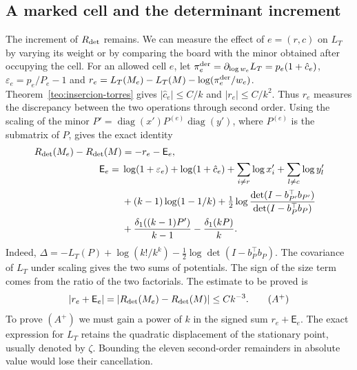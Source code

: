 \subsection{A marked cell and the determinant increment \texorpdfstring{}{[D]}}
The increment of $R_{\rm det}$ remains. We can measure the effect of $e=(r,c)$ on $L_T$ by varying
its weight or by comparing the board with the minor obtained after occupying the cell. For an
allowed cell $e$, let $\pi^{\rm der}_e=\partial_{\log w_e}L_T=p_e(1+\hat c_e)$,
$\varepsilon_e=p_e/P_e-1$ and $r_e=L_T(M_e)-L_T(M)-\log(\pi^{\rm der}_e/w_e)$.
Theorem~\ref{teo:insercion-torres}
gives $|\hat c_e|\le C/k$ and $|r_e|\le C/k^2$. Thus $r_e$ measures the discrepancy between the
two operations through second order. Using the scaling of the minor
$P'=\operatorname{diag}(x')P^{(e)}\operatorname{diag}(y')$, where $P^{(e)}$ is the submatrix of
$P$, gives the exact identity
\begin{align*}
 R_{\rm det}(M_e)-R_{\rm det}(M)&=-r_e-\mathsf E_e,\\
 \mathsf E_e={}&\log(1+\varepsilon_e)+\log(1+\hat c_e)
          +\sum_{i\ne r}\log x'_i+\sum_{l\ne c}\log y'_l\\
 &+(k-1)\log(1-1/k)
  +\tfrac12\log\frac{\det(I-b_{P'}^\top b_{P'})}{\det(I-b_P^\top b_P)}\\
 &+\frac{\delta_1((k-1)P')}{k-1}-\frac{\delta_1(kP)}k .
\end{align*}
Indeed, $\Delta=-L_T(P)+\log(k!/k^k)-\frac12\log\det(I-b_P^\top b_P)$. The covariance of $L_T$
under scaling gives the two sums of potentials. The sign of the size term comes from the ratio of
the two factorials. The estimate to be proved is
\[
 |r_e+\mathsf E_e|=|R_{\rm det}(M_e)-R_{\rm det}(M)|\le Ck^{-3}. \tag{$A^+$}
\]
To prove $(A^+)$ we must gain a power of $k$ in the signed sum $r_e+\mathsf E_e$. The exact expression
for $L_T$ retains the quadratic displacement of the stationary point,
usually denoted by $\zeta$. Bounding the eleven second-order remainders in absolute value would
lose their cancellation.


